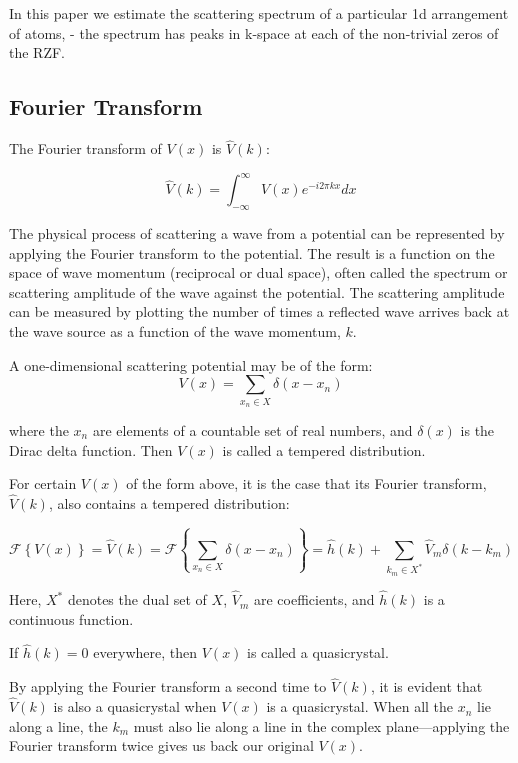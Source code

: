 \documentclass[11pt, oneside]{article}
\begin{document}
In this paper we estimate the scattering spectrum of a particular 1d arrangement of atoms,  - the spectrum has peaks in k-space at each of the non-trivial zeros of the RZF.  

\subsection{Fourier Transform}
The Fourier transform of $V(x)$ is $\hat{V}(k)$:

\begin{equation}
\hat{V}(k) = \int_{-\infty}^{\infty}V(x)e^{-i2\pi kx}dx
\end{equation}

The physical process of scattering a wave from a potential can be represented by applying the Fourier transform to the potential. The result is a function on the space of wave momentum (reciprocal or dual space), often called the spectrum or scattering amplitude of the wave against the potential. The scattering amplitude can be measured by plotting the number of times a reflected wave arrives back at the wave source as a function of the wave momentum, $k$.

A one-dimensional scattering potential may be of the form:
\begin{equation}
V(x) = \sum_{x_n \in X}\delta(x - x_n)
\end{equation} 
 
where the $x_n$ are elements of a countable set of real numbers, and $\delta(x)$ is the Dirac delta function. Then $V(x)$ is called a tempered distribution.

For certain $V(x)$ of the form above, it is the case that its Fourier transform, $\hat{V}(k)$, also contains a tempered distribution:
  
\begin{equation}
 \label{eq: RiemannFourier}
 \mathcal{F}\left \{V(x)\right \} = \hat{V}(k) = \mathcal{F}\left \{ \sum_{x_n \in X}\delta(x - x_n) \right \} = \hat{h}(k) +  \sum_{k_m \in X^{*}} \hat{V}_{m} \delta(k - k_{m})
\end{equation}

Here, $X^*$ denotes the dual set of $X$, $\hat{V}_{m}$ are coefficients, and $\hat{h}(k)$ is a continuous function.

If $\hat{h}(k) = 0$ everywhere, then $V(x)$ is called a quasicrystal.

By applying the Fourier transform a second time to $\hat{V}(k)$, it is evident that $\hat{V}(k)$ is also a quasicrystal when $V(x)$ is a quasicrystal. When all the $x_n$ lie along a line, the $k_m$ must also lie along a line in the complex plane—applying the Fourier transform twice gives us back our original $V(x)$.
\end{document}
